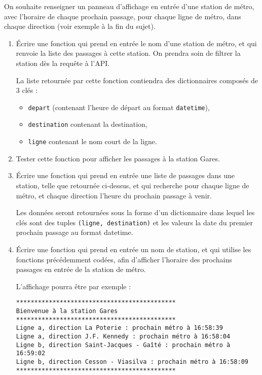 \documentclass[11pt,a4paper]{article}
\begin{document}
On souhaite renseigner un panneau d'affichage en entrée d'une station de métro, avec l'horaire de chaque prochain passage, pour chaque ligne de métro, dans chaque direction (voir exemple à la fin du sujet). 

\begin{enumerate}
    \item Écrire une fonction qui prend en entrée le nom d'une station de métro, et qui renvoie la liste des passages à cette station. On prendra soin de filtrer la station dès la requête à l'API.

    La liste retournée par cette fonction contiendra des dictionnaires composés de 3 clés : 
    \begin{itemize}
        \item \verb+depart+ (contenant l'heure de départ au format \verb+datetime+), 
        \item \verb+destination+ contenant la destination,
       \item \verb+ligne+ contenant le nom court de la ligne.
    \end{itemize}
    \item Tester cette fonction pour afficher les passages à la station Gares.
    \item Écrire une fonction qui prend en entrée une liste de passages dans une station, telle que retournée ci-dessus, et qui recherche pour chaque ligne de métro, et chaque direction l'heure du prochain passage à venir. 
    
    Les données seront retournées sous la forme d'un dictionnaire dans lequel les clés sont des tuples \verb+(ligne, destination)+ et les valeurs la date du premier prochain passage au format datetime. 

    \item Écrire une fonction qui prend en entrée un nom de station, et qui utilise les fonctions précédemment codées, afin d'afficher l'horaire des prochains passages en entrée de la station de métro. 
    
    L'affichage pourra être par exemple : 
    \begin{verbatim}
********************************************
Bienvenue à la station Gares
********************************************
Ligne a, direction La Poterie : prochain métro à 16:58:39
Ligne a, direction J.F. Kennedy : prochain métro à 16:58:04
Ligne b, direction Saint-Jacques - Gaîté : prochain métro à 16:59:02
Ligne b, direction Cesson - Viasilva : prochain métro à 16:58:09
********************************************
\end{verbatim}
\end{enumerate}
\end{document}
